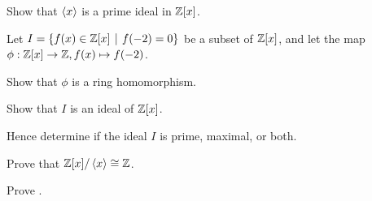 \begin{problem}
    Show that $\left\langle x\right\rangle$ is a prime ideal in $\mathbb{Z}[x]$.
\end{problem}

\begin{problem}
    Let $I = \{f(x) \in \Z[x] \vert f(-2) = 0\}$ be a subset of $\mathbb{Z}[x]$, and let the map $\phi:\mathbb{Z}[x]\to\mathbb{Z}, f(x) \mapsto f(-2)$.
    \begin{partquestions}{\roman*}
        \item Show that $\phi$ is a ring homomorphism.
        \item Show that $I$ is an ideal of $\mathbb{Z}[x]$.
        \item Hence determine if the ideal $I$ is prime, maximal, or both.
    \end{partquestions}
\end{problem}

\begin{problem}
    Prove that $\mathbb{Z}[x] / \left\langle x\right\rangle \cong \mathbb{Z}$.
\end{problem}

\begin{problem}\label{problem-remainder-theorem}
    Prove .
\end{problem}

